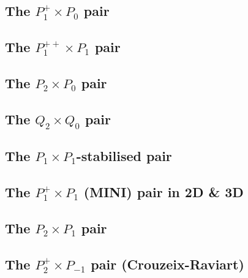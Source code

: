 \subsection{The ${ P}_1^+\times P_0$ pair} \label{ss:p1pp0}


\subsection{The ${ P}_1^{++}\times P_1$ pair} \label{ss:p1ppp1}


\subsection{The ${ P}_2\times P_0$ pair} \label{ss:p2p0}


\subsection{The $Q_2\times Q_0$ pair} \label{ss:pairq2q0}


\subsection{The ${ P}_1\times P_1$-stabilised pair} \label{ss:P1P1stab}


\subsection{The ${ P}_1^+\times P_1$ (MINI) pair in 2D \& 3D \label{pair:mini}}


\subsection{The ${ P}_2\times P_1$ pair \label{ss:p2p1}}


\subsection{The ${ P}_2^+\times P_{-1}$ pair  (Crouzeix-Raviart) } \label{sec:crouzeix-raviart}


